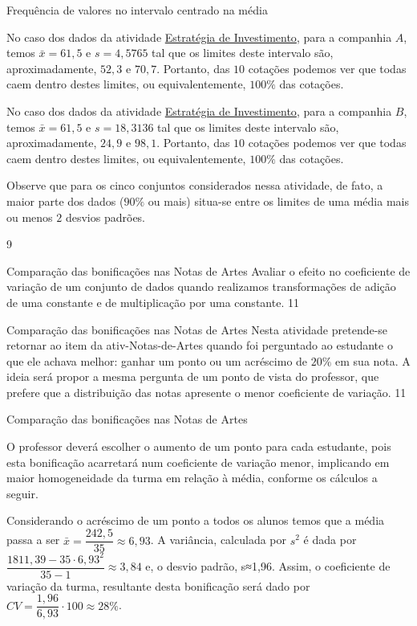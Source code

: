 {\begin{answer}{Frequência de valores no intervalo centrado na média}
{No caso dos dados da atividade \hyperref[\detokenize{PE104-3:ativ-estrategia-de-investimento}]{Estratégia de Investimento}, para a companhia $A$, temos $\bar{x}=61{,}5$ e $s=4{,}5765$ tal que os limites deste intervalo são, aproximadamente, $52{,}3$ e $70{,}7$. Portanto, das $10$ cotações podemos ver que todas caem dentro destes limites, ou equivalentemente, $100\%$ das cotações.

No caso dos dados da atividade \hyperref[\detokenize{PE104-3:ativ-estrategia-de-investimento}]{Estratégia de Investimento}, para a companhia $B$, temos $\bar{x}=61{,}5$ e $s=18{,}3136$ tal que os limites deste intervalo são, aproximadamente, $24{,}9$ e $98{,}1$. Portanto, das $10$ cotações podemos ver que todas caem dentro destes limites, ou equivalentemente, $100\%$ das cotações.

Observe que para os cinco conjuntos considerados nessa atividade, de fato, a maior parte dos dados ($90\%$ ou mais) situa-se entre os limites de uma média mais ou menos $2$ desvios padrões.
\columnbreak

\phantom{a}
}{9}
\end{answer}

\begin{objectives}{Comparação das bonificações nas Notas de Artes}
{
Avaliar o efeito no coeficiente de variação de um conjunto de dados quando realizamos transformações de adição de uma constante e de multiplicação por uma constante.
}{1}{1}
\end{objectives}
\marginpar{\vspace{-2em}}
\begin{sugestions}{Comparação das bonificações nas Notas de Artes}
{
Nesta atividade pretende-se retornar ao item  da ativ-Notas-de-Artes quando foi perguntado ao estudante o que ele achava melhor: ganhar um ponto ou um acréscimo de $20\%$ em sua nota. A ideia será propor a mesma pergunta de um ponto de vista do professor, que prefere que a distribuição das notas apresente o menor coeficiente de variação.
}{1}{1}
\end{sugestions}
\begin{answer}{Comparação das bonificações nas Notas de Artes}
{
O professor deverá escolher o aumento de um ponto para cada estudante, pois esta bonificação acarretará num coeficiente de variação menor, implicando em maior homogeneidade da turma em relação à média, conforme os cálculos a seguir.

Considerando o acréscimo de um ponto a todos os alunos temos que a média passa a ser $\bar{x}=\dfrac{242{,}5}{35}\approx6{,}93$. A variância, calculada por $s^2$ é dada por $\dfrac{1811{,}39-35\cdot6{,}93^2}{35-1}\approx3{,}84$ e, o desvio padrão, s≈1,96. Assim, o coeficiente de variação da turma, resultante desta bonificação será dado por $CV=\dfrac{1{,}96}{6{,}93}\cdot100\approx28\%$.

}
\end{answer}}
